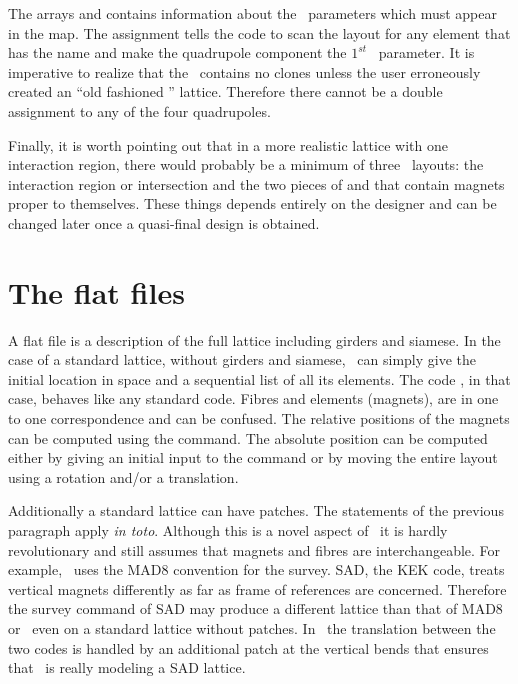 {The arrays  and  contains information about the \TPSA\ parameters which must appear in the map. The assignment  tells the code to scan the layout    for any element that has the name  and make the quadrupole component the $1^{st}$ \TPSA\ parameter. It is imperative to realize that the \DNA\ contains no clones unless the user erroneously created an ``old fashioned '' lattice. Therefore there cannot be a double assignment  to any of the four quadrupoles.

Finally, it is worth pointing out that in a more realistic lattice with one interaction region, there would probably be a minimum of three \DNA\ layouts: the interaction region or intersection and the two pieces of  and  that contain magnets proper to themselves.  These things depends entirely on the designer and can be changed later once a quasi-final design is obtained. 

\section{The flat files}
\label{sec:model.flat}

A flat file is a description of the full lattice including girders and siamese. In the case of a standard lattice, without girders and siamese, \PTC\ can simply give the initial location in space and a sequential list of all its elements.  The code \PTC, in that case, behaves like any standard code. Fibres and elements (magnets), are in one to one correspondence and can be confused. The relative positions of the magnets can be computed using the  command. The absolute position can be computed either by giving an initial input to the  command or by moving the entire layout using a rotation and/or a translation.  

Additionally a standard lattice can have patches. The statements of the previous paragraph apply \emph{in toto}. Although this is a novel aspect of \PTC\ it is hardly revolutionary and still assumes that magnets and fibres are interchangeable. For example, \PTC\ uses the MAD8 convention for the survey. SAD, the KEK code, treats vertical magnets differently as far as frame of references are concerned. Therefore the survey command of SAD may produce a different lattice than that of MAD8 or \PTC\ even on a standard lattice without patches. In \PTC\ the translation between the two codes is handled by an additional patch at the vertical bends that ensures that \PTC\ is really modeling a SAD lattice.


}
